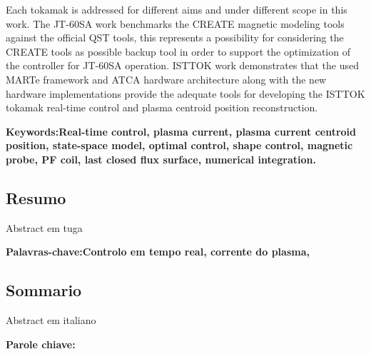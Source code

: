 Each tokamak is addressed for different aims and under different scope in this work. The JT-60SA work benchmarks the CREATE magnetic modeling tools against the official QST tools, this represents a possibility for considering the CREATE tools as possible backup tool in order to support the optimization of the controller for  JT-60SA operation. ISTTOK work demonstrates that the used MARTe framework and  ATCA hardware architecture along with the new hardware implementations provide the adequate tools for developing the ISTTOK tokamak real-time control and plasma centroid position reconstruction.

\textbf{Keywords:Real-time control, plasma current, plasma current centroid position, state-space model, optimal control, shape control, magnetic probe, PF coil, last closed flux surface, numerical integration.} 

\pagebreak
\begin{otherlanguage}{portuguese}
\chapter*{Resumo}
Abstract em tuga

\vfill

\textbf{ Palavras-chave:Controlo em tempo real, corrente do plasma,  } 
\end{otherlanguage}
\pagebreak
\begin{otherlanguage}{italian}
\chapter*{Sommario}

Abstract em italiano


\vfill

\textbf{Parole chiave:} 
\end{otherlanguage}



